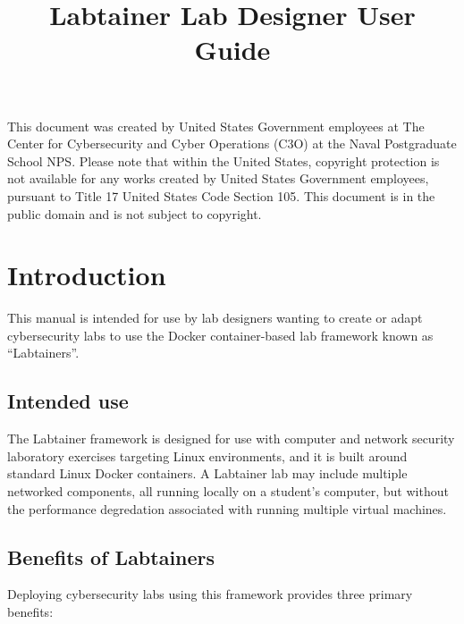 \documentclass[12pt]{article}
\begin{document}
\begin{titlepage}
\title {Labtainer Lab Designer User Guide}
\maketitle

\vspace{2.0in}
This document was created by United States Government employees at 
The Center for Cybersecurity and Cyber Operations (C3O) at the Naval Postgraduate School NPS. 
Please note that within the United States, copyright protection is not available for any works created  
by United States Government employees, pursuant to Title 17 United States Code Section 105.   
This document is in the public domain and is not subject to copyright. 
\end{titlepage}
\tableofcontents
\newpage
\section {Introduction}
This manual is intended for use by lab designers wanting
to create or adapt cybersecurity labs to use the Docker
container-based lab framework known as ``Labtainers''.

\subsection{Intended use}
The Labtainer framework is designed for use with computer and network security
laboratory exercises targeting Linux environments, and it is built around 
standard Linux Docker containers.  A Labtainer lab may include multiple 
networked components, all running locally on a student's computer, but without
the performance degredation associated with running multiple virtual machines.
\subsection {Benefits of Labtainers}

Deploying cybersecurity labs using this framework
provides three primary benefits:
\end{document}
